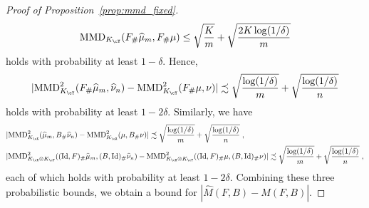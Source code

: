 \documentclass[11pt]{article}
\begin{document}
\begin{proof}[Proof of Proposition~\ref{prop:mmd_fixed}]
\begin{equation*}
		\mathrm{MMD}_{K_{\cY}}(F_{\#}\widehat{\mu}_m, F_{\#}\mu) \le \sqrt{\frac{K}{m}} + \sqrt{\frac{2 K \log(1/\delta)}{m}}
	\end{equation*}
	holds with probability at least $1 - \delta$. Hence,
	\begin{equation*}
		|\mathrm{MMD}^2_{K_{\cY}}(F_{\#}\widehat{\mu}_m, \widehat{\nu}_n) - \mathrm{MMD}^2_{K_{\cY}}(F_{\#}\mu, \nu)| \precsim \sqrt{\frac{\log(1 / \delta)}{m}} + \sqrt{\frac{\log(1 / \delta)}{n}}
	\end{equation*}
	holds with probability at least $1 - 2 \delta$. Similarly, we have
	\begin{align*}
		& |\mathrm{MMD}^2_{K_{\cX}}(\widehat{\mu}_m, B_{\#}\widehat{\nu}_n) - \mathrm{MMD}^2_{K_{\cX}}(\mu, B_{\#} \nu)| \precsim \sqrt{\frac{\log(1 / \delta)}{m}} + \sqrt{\frac{\log(1 / \delta)}{n}}\;, \\
		& |\mathrm{MMD}^2_{K_{\cX} \otimes K_{\cY}} ((\mathrm{Id}, F)_{\#}\widehat{\mu}_m, (B, \mathrm{Id})_{\#} \widehat{\nu}_n) - \mathrm{MMD}^2_{K_{\cX} \otimes K_{\cY}} ((\mathrm{Id}, F)_{\#}\mu, (B, \mathrm{Id})_{\#} \nu)| \precsim \sqrt{\frac{\log(1 / \delta)}{m}} + \sqrt{\frac{\log(1 / \delta)}{n}}\;,
	\end{align*}
	each of which holds with probability at least $1 - 2 \delta$. Combining these three probabilistic bounds, we obtain a bound for $|\widehat{M}(F, B) - M(F, B)|$.
\end{proof}
\end{document}
